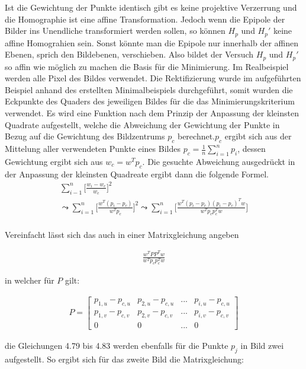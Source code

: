 Ist die Gewichtung der Punkte identisch gibt es keine projektive Verzerrung und die Homographie ist eine affine Transformation. Jedoch wenn die Epipole der Bilder ins Unendliche transformiert werden sollen, so können $H_p$ und $H_p'$ keine affine Homograhien sein. Sonst könnte man die Epipole nur innerhalb der affinen Ebenen, sprich den Bildebenen, verschieben. Also bildet der Versuch $H_p$ und $H_p'$ so affin wie möglich zu machen die Basis für die Minimierung. Im Realbeispiel werden alle Pixel des Bildes verwendet. Die Rektifizierung wurde im aufgeführten Beispiel anhand des erstellten Minimalbeispiels durchgeführt, somit wurden die Eckpunkte des Quaders des jeweiligen Bildes für die das Minimierungskriterium verwendet. Es wird eine Funktion nach dem Prinzip der Anpassung der kleinsten Quadrate aufgestellt, welche die Abweichung der Gewichtung der Punkte in Bezug auf die Gewichtung des Bildzentrums $p_c$ berechnet.$p_c$ ergibt sich aus der Mittelung aller verwendeten Punkte eines Bildes $p_c = \frac{1}{n} \sum_{i=1}^{n} p_i$, dessen Gewichtung ergibt sich aus $w_c= w^T p_c$. Die gesuchte Abweichung ausgedrückt in der Anpassung der kleinsten Quadreate ergibt dann die folgende Formel.\\

\begin{gather}
	\sum_{i-1}^{n}\Big[\frac{w_i-w_c}{w_c} \Big]^2\\
	\leadsto \sum_{i=1}^{n}\Big[\frac{w^T (p_i-p_c)}{w^Tp_c} \Big]^2
	\leadsto \sum_{i=1}^{n}\Big[\frac{w^T (p_i-p_c)(p_i-p_c)^Tw}{w^Tp_cp_c^Tw} \Big]
\end{gather}\\

Vereinfacht lässt sich das auch in einer Matrixgleichung angeben

\begin{gather}
	\frac{w^TPP^Tw}{w^Tp_cp_c^Tw}
\end{gather}

in welcher für $P$ gilt:

\begin{gather}
	P=\begin{bmatrix}
	p_{1,u}-p_{c,u}&p_{2,u}-p_{c,u}&...&p_{i,u}-p_{c,u}\\
	p_{1,v}-p_{c,v}&p_{2,v}-p_{c,v}&...&p_{i,v}-p_{c,v}\\
	0&0&...&0	
	\end{bmatrix}
\end{gather}

die Gleichungen 4.79 bis 4.83 werden ebenfalls für die Punkte $p_j$ in Bild zwei aufgestellt. So ergibt sich für das zweite Bild die Matrixgleichung:

